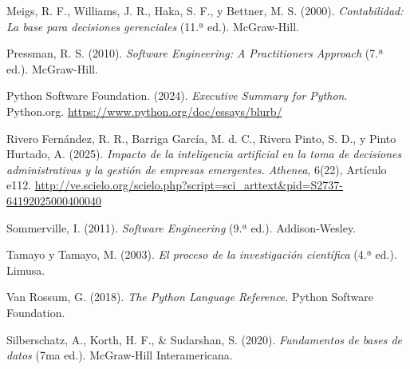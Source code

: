 Meigs, R. F., Williams, J. R., Haka, S. F., y Bettner, M. S. (2000). \emph{Contabilidad: La base para decisiones gerenciales} (11.ª ed.). McGraw-Hill.

Pressman, R. S. (2010). \emph{Software Engineering: A Practitioner\textquotesingle s Approach} (7.ª ed.). McGraw-Hill.

Python Software Foundation. (2024). \emph{Executive Summary for Python}. Python.org. \url{https://www.python.org/doc/essays/blurb/}

Rivero Fernández, R. R., Barriga García, M. d. C., Rivera Pinto, S. D., y Pinto Hurtado, A. (2025). \emph{Impacto de la inteligencia artificial en la toma de decisiones administrativas y la gestión de empresas emergentes. Athenea}, 6(22), Artículo e112. \url{http://ve.scielo.org/scielo.php?script=sci_arttext&pid=S2737-64192025000400040}

Sommerville, I. (2011). \emph{Software Engineering} (9.ª ed.). Addison-Wesley.

Tamayo y Tamayo, M. (2003). \emph{El proceso de la investigación científica} (4.ª ed.). Limusa.

Van Rossum, G. (2018). \emph{The Python Language Reference}. Python Software Foundation.

Silberschatz, A., Korth, H. F., \& Sudarshan, S. (2020). \emph{Fundamentos de bases de datos} (7ma ed.). McGraw-Hill Interamericana.
\endgroup
